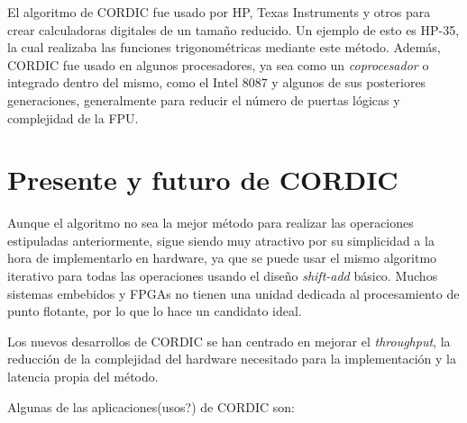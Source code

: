 El algoritmo de CORDIC fue usado por HP, Texas Instruments y otros para crear calculadoras digitales de un tamaño reducido. Un ejemplo de esto es HP-35, la cual realizaba las funciones trigonométricas mediante este método. Además, CORDIC fue usado en algunos procesadores, ya sea como un \textit{coprocesador} o integrado dentro del mismo, como el Intel 8087 y algunos de sus posteriores generaciones, generalmente para reducir el número de puertas lógicas y complejidad de la FPU.


\section{Presente y futuro de CORDIC}

Aunque el algoritmo no sea la mejor método para realizar las operaciones estipuladas anteriormente, sigue siendo muy atractivo por su simplicidad a la hora de implementarlo en hardware, ya que se puede usar el mismo algoritmo iterativo para todas las operaciones usando el diseño \textit{shift-add} básico. Muchos sistemas embebidos y FPGAs no tienen una unidad dedicada al procesamiento de punto flotante, por lo que lo hace un candidato ideal. 

Los nuevos desarrollos de CORDIC se han centrado en mejorar el \textit{throughput}, la reducción de la complejidad del hardware necesitado para la implementación y la latencia propia del método.

Algunas de las aplicaciones(usos?) de CORDIC son:


